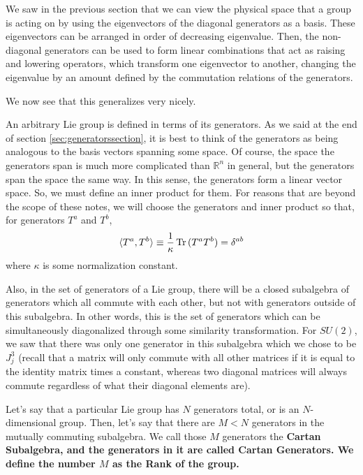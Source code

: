 \documentclass[12pt,epsf]{article}
\def\Tr{\mathop{\rm Tr \,} \nolimits}
\begin{document}
We saw in the previous section that we can view the physical space that a
group is acting on by using the eigenvectors of the diagonal generators
as a basis.  These eigenvectors can be arranged in order of decreasing
eigenvalue.  Then, the non-diagonal generators can be used to form
linear combinations that act as raising and lowering operators, which
transform one eigenvector to another, changing the eigenvalue by an
amount defined by the commutation relations of the generators.	

We now see that this generalizes very nicely.  

An arbitrary Lie group is defined in terms of its generators.  As we
said at the end of section \ref{sec:generatorssection}, it is best to
think of the generators as being analogous to the basis vectors
spanning some space.  Of course, the space the generators span is much
more complicated than $\mathbb{R}^n$ in general, but the generators
span the space the same way.  In this sense, the generators form a
linear vector space.  So, we must define an inner product for them. 
For reasons that are beyond the scope of these notes, we will choose
the generators and inner product so that, for generators $T^a$ and
$T^b$,
\begin{eqnarray}
\langle T^a,T^b\rangle \equiv {1\over \kappa} \Tr(T^aT^b) = \delta^{ab}
\label{eq:killing}
\end{eqnarray}
where $\kappa$ is some normalization constant.	

Also, in the set of generators of a Lie group, there will be a closed
subalgebra of generators which all commute with each other, but not
with generators outside of this subalgebra.  In other words, this is
the set of generators which can be simultaneously diagonalized through
some similarity transformation.  For $SU(2)$, we saw that there was only
one generator in this subalgebra which we chose to be $J^3_j$ (recall
that a matrix will only commute with all other matrices if it is equal
to the identity matrix times a constant, whereas two diagonal matrices
will always commute regardless of what their diagonal elements are).  

Let's say that a particular Lie group has $N$ generators total, or is
an $N$-dimensional group.  Then, let's say that there are $M<N$
generators in the mutually commuting subalgebra.  We call those $M$
generators the \bf Cartan Subalgebra\rm, and the generators in it are
called \bf Cartan Generators\rm.  We define the number $M$ as the \bf
Rank \rm of the group.	
\end{document}
